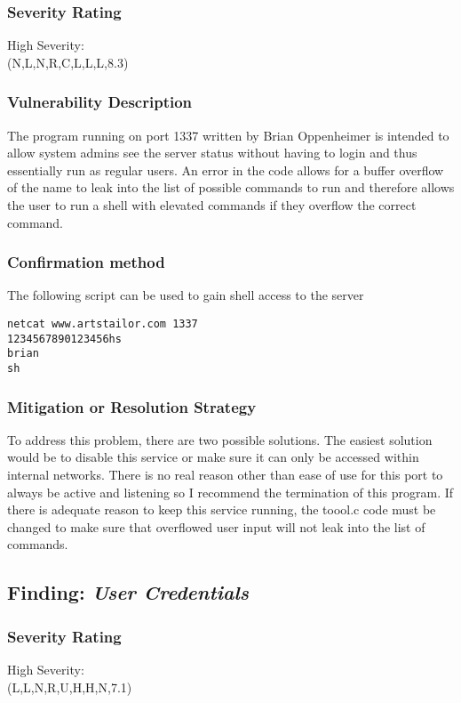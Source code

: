 \documentclass[notitlepage]{article}
\begin{document}
	\subsubsection*{Severity Rating}
		High Severity: \\
		\cvss(N,L,N,R,C,L,L,L,8.3)
		
  	\subsubsection*{Vulnerability Description}
  		The program running on port 1337 written by Brian Oppenheimer is intended to allow system admins see the server status without having to login and
        thus essentially run as regular users. An error in the code allows for a buffer overflow of the name to leak into the list of possible commands to run
        and therefore allows the user to run a shell with elevated commands if they overflow the correct command. 
  	\subsubsection*{Confirmation method}
  	    The following script can be used to gain shell access to the server
    \begin{verbatim}
netcat www.artstailor.com 1337
1234567890123456hs
brian
sh
    \end{verbatim}
				
    \subsubsection*{Mitigation or Resolution Strategy}
    To address this problem, there are two possible solutions. The easiest solution would be to disable this service or make sure it can only be accessed
    within internal networks. There is no real reason other than ease of use for this port to always be active and listening so I recommend the termination of
    this program. If there is adequate reason to keep this service running, the toool.c code must be changed to make sure that overflowed user input will not
    leak into the list of commands.




  \subsection{Finding: \emph{User Credentials}}
  
	\subsubsection*{Severity Rating}
	    High Severity: \\    
		\cvss(L,L,N,R,U,H,H,N,7.1)
		
\end{document}
